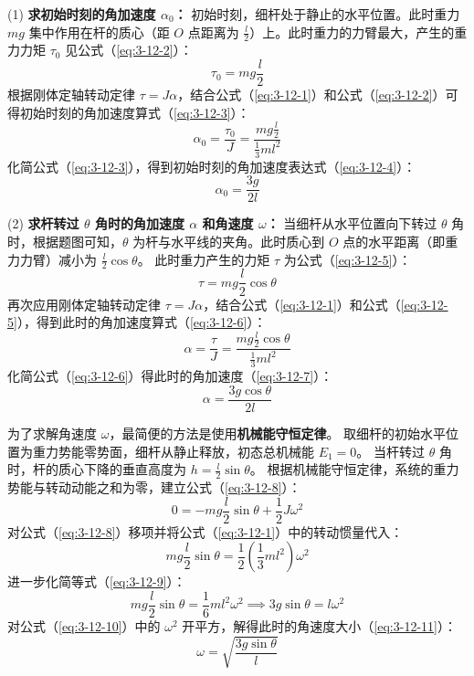 (1) \textbf{求初始时刻的角加速度 $\alpha_0$：}
初始时刻，细杆处于静止的水平位置。此时重力 $mg$ 集中作用在杆的质心（距 $O$ 点距离为 $\frac{l}{2}$）上。此时重力的力臂最大，产生的重力力矩 $\tau_0$ 见公式（\ref{eq:3-12-2}）：
\begin{equation}\label{eq:3-12-2}
	\tau_0 = mg \frac{l}{2}
\end{equation}
根据刚体定轴转动定律 $\tau = J\alpha$，结合公式（\ref{eq:3-12-1}）和公式（\ref{eq:3-12-2}）可得初始时刻的角加速度算式（\ref{eq:3-12-3}）：
\begin{equation}\label{eq:3-12-3}
	\alpha_0 = \frac{\tau_0}{J} = \frac{mg \frac{l}{2}}{\frac{1}{3}ml^2}
\end{equation}
化简公式（\ref{eq:3-12-3}），得到初始时刻的角加速度表达式（\ref{eq:3-12-4}）：
\begin{equation}\label{eq:3-12-4}
	\alpha_0 = \frac{3g}{2l}
\end{equation}

(2) \textbf{求杆转过 $\theta$ 角时的角加速度 $\alpha$ 和角速度 $\omega$：}
当细杆从水平位置向下转过 $\theta$ 角时，根据题图可知，$\theta$ 为杆与水平线的夹角。此时质心到 $O$ 点的水平距离（即重力力臂）减小为 $\frac{l}{2} \cos\theta$。
此时重力产生的力矩 $\tau$ 为公式（\ref{eq:3-12-5}）：
\begin{equation}\label{eq:3-12-5}
	\tau = mg \frac{l}{2} \cos\theta
\end{equation}
再次应用刚体定轴转动定律 $\tau = J\alpha$，结合公式（\ref{eq:3-12-1}）和公式（\ref{eq:3-12-5}），得到此时的角加速度算式（\ref{eq:3-12-6}）：
\begin{equation}\label{eq:3-12-6}
	\alpha = \frac{\tau}{J} = \frac{mg \frac{l}{2} \cos\theta}{\frac{1}{3}ml^2}
\end{equation}
化简公式（\ref{eq:3-12-6}）得此时的角加速度（\ref{eq:3-12-7}）：
\begin{equation}\label{eq:3-12-7}
	\alpha = \frac{3g \cos\theta}{2l}
\end{equation}

为了求解角速度 $\omega$，最简便的方法是使用\textbf{机械能守恒定律}。
取细杆的初始水平位置为重力势能零势面，细杆从静止释放，初态总机械能 $E_1 = 0$。
当杆转过 $\theta$ 角时，杆的质心下降的垂直高度为 $h = \frac{l}{2} \sin\theta$。
根据机械能守恒定律，系统的重力势能与转动动能之和为零，建立公式（\ref{eq:3-12-8}）：
\begin{equation}\label{eq:3-12-8}
	0 = -mg \frac{l}{2} \sin\theta + \frac{1}{2}J\omega^2 
\end{equation}
对公式（\ref{eq:3-12-8}）移项并将公式（\ref{eq:3-12-1}）中的转动惯量代入：
\begin{equation}\label{eq:3-12-9}
	mg \frac{l}{2} \sin\theta = \frac{1}{2} \left(\frac{1}{3}ml^2\right) \omega^2
\end{equation}
进一步化简等式（\ref{eq:3-12-9}）：
\begin{equation}\label{eq:3-12-10}
	mg \frac{l}{2} \sin\theta = \frac{1}{6} ml^2 \omega^2 \implies 3g \sin\theta = l\omega^2
\end{equation}
对公式（\ref{eq:3-12-10}）中的 $\omega^2$ 开平方，解得此时的角速度大小（\ref{eq:3-12-11}）：
\begin{equation}\label{eq:3-12-11}
	\omega = \sqrt{\frac{3g \sin\theta}{l}}
\end{equation}

